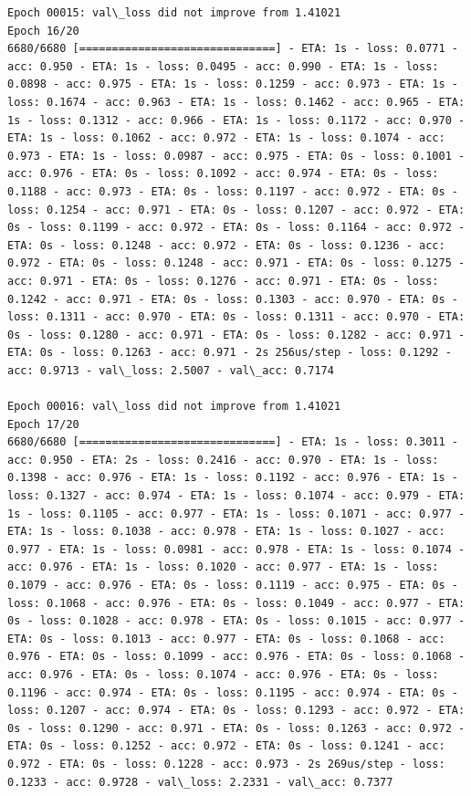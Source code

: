 \documentclass[11pt]{article}
\begin{document}
\begin{Verbatim}[commandchars=\\\{\}]
Epoch 00015: val\_loss did not improve from 1.41021
Epoch 16/20
6680/6680 [==============================] - ETA: 1s - loss: 0.0771 - acc: 0.950 - ETA: 1s - loss: 0.0495 - acc: 0.990 - ETA: 1s - loss: 0.0898 - acc: 0.975 - ETA: 1s - loss: 0.1259 - acc: 0.973 - ETA: 1s - loss: 0.1674 - acc: 0.963 - ETA: 1s - loss: 0.1462 - acc: 0.965 - ETA: 1s - loss: 0.1312 - acc: 0.966 - ETA: 1s - loss: 0.1172 - acc: 0.970 - ETA: 1s - loss: 0.1062 - acc: 0.972 - ETA: 1s - loss: 0.1074 - acc: 0.973 - ETA: 1s - loss: 0.0987 - acc: 0.975 - ETA: 0s - loss: 0.1001 - acc: 0.976 - ETA: 0s - loss: 0.1092 - acc: 0.974 - ETA: 0s - loss: 0.1188 - acc: 0.973 - ETA: 0s - loss: 0.1197 - acc: 0.972 - ETA: 0s - loss: 0.1254 - acc: 0.971 - ETA: 0s - loss: 0.1207 - acc: 0.972 - ETA: 0s - loss: 0.1199 - acc: 0.972 - ETA: 0s - loss: 0.1164 - acc: 0.972 - ETA: 0s - loss: 0.1248 - acc: 0.972 - ETA: 0s - loss: 0.1236 - acc: 0.972 - ETA: 0s - loss: 0.1248 - acc: 0.971 - ETA: 0s - loss: 0.1275 - acc: 0.971 - ETA: 0s - loss: 0.1276 - acc: 0.971 - ETA: 0s - loss: 0.1242 - acc: 0.971 - ETA: 0s - loss: 0.1303 - acc: 0.970 - ETA: 0s - loss: 0.1311 - acc: 0.970 - ETA: 0s - loss: 0.1311 - acc: 0.970 - ETA: 0s - loss: 0.1280 - acc: 0.971 - ETA: 0s - loss: 0.1282 - acc: 0.971 - ETA: 0s - loss: 0.1263 - acc: 0.971 - 2s 256us/step - loss: 0.1292 - acc: 0.9713 - val\_loss: 2.5007 - val\_acc: 0.7174

Epoch 00016: val\_loss did not improve from 1.41021
Epoch 17/20
6680/6680 [==============================] - ETA: 1s - loss: 0.3011 - acc: 0.950 - ETA: 2s - loss: 0.2416 - acc: 0.970 - ETA: 1s - loss: 0.1398 - acc: 0.976 - ETA: 1s - loss: 0.1192 - acc: 0.976 - ETA: 1s - loss: 0.1327 - acc: 0.974 - ETA: 1s - loss: 0.1074 - acc: 0.979 - ETA: 1s - loss: 0.1105 - acc: 0.977 - ETA: 1s - loss: 0.1071 - acc: 0.977 - ETA: 1s - loss: 0.1038 - acc: 0.978 - ETA: 1s - loss: 0.1027 - acc: 0.977 - ETA: 1s - loss: 0.0981 - acc: 0.978 - ETA: 1s - loss: 0.1074 - acc: 0.976 - ETA: 1s - loss: 0.1020 - acc: 0.977 - ETA: 1s - loss: 0.1079 - acc: 0.976 - ETA: 0s - loss: 0.1119 - acc: 0.975 - ETA: 0s - loss: 0.1068 - acc: 0.976 - ETA: 0s - loss: 0.1049 - acc: 0.977 - ETA: 0s - loss: 0.1028 - acc: 0.978 - ETA: 0s - loss: 0.1015 - acc: 0.977 - ETA: 0s - loss: 0.1013 - acc: 0.977 - ETA: 0s - loss: 0.1068 - acc: 0.976 - ETA: 0s - loss: 0.1099 - acc: 0.976 - ETA: 0s - loss: 0.1068 - acc: 0.976 - ETA: 0s - loss: 0.1074 - acc: 0.976 - ETA: 0s - loss: 0.1196 - acc: 0.974 - ETA: 0s - loss: 0.1195 - acc: 0.974 - ETA: 0s - loss: 0.1207 - acc: 0.974 - ETA: 0s - loss: 0.1293 - acc: 0.972 - ETA: 0s - loss: 0.1290 - acc: 0.971 - ETA: 0s - loss: 0.1263 - acc: 0.972 - ETA: 0s - loss: 0.1252 - acc: 0.972 - ETA: 0s - loss: 0.1241 - acc: 0.972 - ETA: 0s - loss: 0.1228 - acc: 0.973 - 2s 269us/step - loss: 0.1233 - acc: 0.9728 - val\_loss: 2.2331 - val\_acc: 0.7377


\end{Verbatim}
\end{document}

